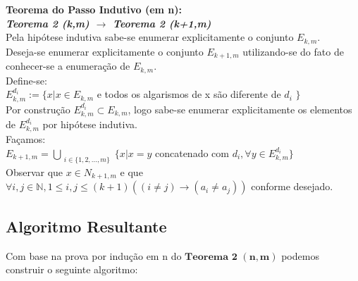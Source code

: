 \documentclass[twoside]{article}
\begin{document}
\begin{multicols}{2}
\textbf{Teorema do Passo Indutivo (em n):}\\
\textit{\textbf{Teorema 2 (k,m) $\rightarrow$ Teorema 2 (k+1,m)}}\\
Pela hipótese indutiva sabe-se enumerar explicitamente o conjunto $E_{k,m}$.\\
Deseja-se enumerar explicitamente o conjunto  $E_{k+1,m}$ utilizando-se do fato de conhecer-se a enumeração de  $E_{k,m}$.\\

Define-se:\\
$E_{k,m}^{d_i} := \{ x | x \in E_{k,m}$ e todos os algarismos de x são diferente de $d_i$ $\}$\\

Por construção $E_{k,m}^{d_i} \subset E_{k,m}$, logo sabe-se enumerar explicitamente os elementos de $E_{k,m}^{d_i}$ por hipótese indutiva.\\

Façamos:\\
 $E_{k+1,m} = \bigcup_{\substack{ i \in \{1,2,\dots,m\}}} \{ x | x = y$ concatenado com $d_i, \forall y \in E_{k,m}^{d_i}  \}$\\

Observar que $x \in N_{k+1,m}$ e que $\forall i,j \in \mathbb{N}, 1 \leq i,j \leq (k+1) ((i \neq j) \rightarrow ( a_i \neq a_j ))$ conforme desejado.\\


\subsection{ Algoritmo Resultante }
\indent 
Com base na prova por indução em n do $\mathbf{Teorema}$ $\mathbf{2}$ $\mathbf{(n,m)}$ podemos construir o seguinte algoritmo:\\


\end{multicols}
\end{document}
